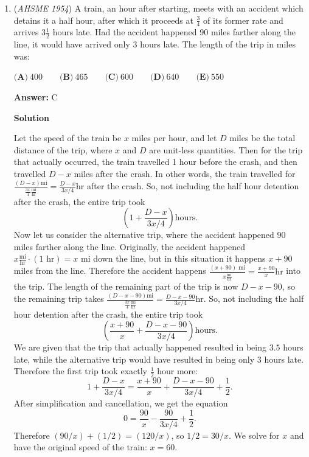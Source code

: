 \begin{enumerate}
 \textbf{Answer: }B



\textbf{Solution}

Note that $AT + TB = p$. Note, also, that $AT * TB = (AM - TM) * (BM + TM) = (AM - TM) * (AM + TM) = AM^2 - TM^2 = TR^2 - TM^2 = MR^2 = q^2$. Therefore, by Vieta's formulas, we have $(x - AT)(x - TB) = x^2 - px + q^2$, so our answer is $\boxed{\textbf{(B)}}$ and we are done.

 


	\item (\textit{AHSME 1954}) A train, an hour after starting, meets with an accident which detains it a half hour, after which it 
proceeds at $\frac{3}{4}$ of its former rate and arrives $3\frac{1}{2}$ hours late. 
Had the accident happened $90$ miles farther along the line, it would have arrived only $3$ hours late. The length of the trip in miles was: 


 $\textbf{(A)}\ 400 \qquad \textbf{(B)}\ 465 \qquad \textbf{(C)}\ 600 \qquad \textbf{(D)}\ 640 \qquad \textbf{(E)}\ 550$

 \textbf{Answer: }C



\textbf{Solution}

Let the speed of the train be $x$ miles per hour, and let $D$ miles be the total distance of the trip, where $x$ and $D$ are unit-less quantities. Then for the trip that actually occurred, the train travelled 1 hour before the crash, and then travelled $D-x$ miles after the crash. In other words, the train travelled for $\frac{(D-x)\text{mi}}{\frac{3x}{4}\frac{\text{mi}}{\text{hr}}}=\frac{D-x}{3x/4}\text{hr}$ after the crash. So, not including the half hour detention after the crash, the entire trip took
 \[\left(1+\frac{D-x}{3x/4}\right)\text{hours}.\]Now let us consider the alternative trip, where the accident happened $90$ miles farther along the line. Originally, the accident happened $x\frac{\text{mi}}{\text{hr}}\cdot(1\text{ hr})=x\text{ mi}$ down the line, but in this situation it happens $x+90$ miles from the line. Therefore the accident happens $\frac{(x+90)\text{ mi}}{x\frac{\text{mi}}{\text{hr}}}=\frac{x+90}{x}\text{hr}$ into the trip. The length of the remaining part of the trip is now $D-x-90$, so the remaining trip takes $\frac{(D-x-90)\text{mi}}{\frac{3x}{4}\frac{\text{mi}}{\text{hr}}}=\frac{D-x-90}{3x/4}\text{hr}$. So, not including the half hour detention after the crash, the entire trip took
 \[\left(\frac{x+90}{x}+\frac{D-x-90}{3x/4}\right)\text{hours}.\]We are given that the trip that actually happened resulted in being $3.5$ hours late, while the alternative trip would have resulted in being only $3$ hours late. Therefore the first trip took exactly $\frac{1}{2}$ hour more:
 \[1+\frac{D-x}{3x/4}=\frac{x+90}{x}+\frac{D-x-90}{3x/4}+\frac{1}{2}.\]After simplification and cancellation, we get the equation
 \[0=\frac{90}{x}-\frac{90}{3x/4}+\frac{1}{2}.\]Therefore $(90/x)+(1/2)=(120/x)$, so $1/2=30/x$. We solve for $x$ and have the original speed of the train: $x=60$.


\end{enumerate}
